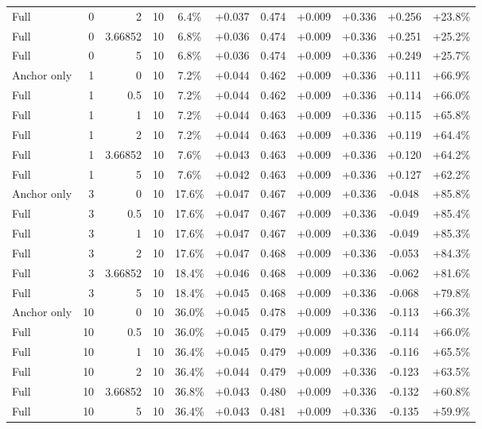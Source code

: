 \begin{table}[htbp]
\begin{tabular}{lrrrccccccc}
Full & 0 & 2 & 10 & 6.4\% & +0.037 & 0.474 & +0.009 & +0.336 & +0.256 & +23.8\% \\
Full & 0 & 3.66852 & 10 & 6.8\% & +0.036 & 0.474 & +0.009 & +0.336 & +0.251 & +25.2\% \\
Full & 0 & 5 & 10 & 6.8\% & +0.036 & 0.474 & +0.009 & +0.336 & +0.249 & +25.7\% \\
Anchor only & 1 & 0 & 10 & 7.2\% & +0.044 & 0.462 & +0.009 & +0.336 & +0.111 & +66.9\% \\
Full & 1 & 0.5 & 10 & 7.2\% & +0.044 & 0.462 & +0.009 & +0.336 & +0.114 & +66.0\% \\
Full & 1 & 1 & 10 & 7.2\% & +0.044 & 0.463 & +0.009 & +0.336 & +0.115 & +65.8\% \\
Full & 1 & 2 & 10 & 7.2\% & +0.044 & 0.463 & +0.009 & +0.336 & +0.119 & +64.4\% \\
Full & 1 & 3.66852 & 10 & 7.6\% & +0.043 & 0.463 & +0.009 & +0.336 & +0.120 & +64.2\% \\
Full & 1 & 5 & 10 & 7.6\% & +0.042 & 0.463 & +0.009 & +0.336 & +0.127 & +62.2\% \\
Anchor only & 3 & 0 & 10 & 17.6\% & +0.047 & 0.467 & +0.009 & +0.336 & -0.048 & +85.8\% \\
Full & 3 & 0.5 & 10 & 17.6\% & +0.047 & 0.467 & +0.009 & +0.336 & -0.049 & +85.4\% \\
Full & 3 & 1 & 10 & 17.6\% & +0.047 & 0.467 & +0.009 & +0.336 & -0.049 & +85.3\% \\
Full & 3 & 2 & 10 & 17.6\% & +0.047 & 0.468 & +0.009 & +0.336 & -0.053 & +84.3\% \\
Full & 3 & 3.66852 & 10 & 18.4\% & +0.046 & 0.468 & +0.009 & +0.336 & -0.062 & +81.6\% \\
Full & 3 & 5 & 10 & 18.4\% & +0.045 & 0.468 & +0.009 & +0.336 & -0.068 & +79.8\% \\
Anchor only & 10 & 0 & 10 & 36.0\% & +0.045 & 0.478 & +0.009 & +0.336 & -0.113 & +66.3\% \\
Full & 10 & 0.5 & 10 & 36.0\% & +0.045 & 0.479 & +0.009 & +0.336 & -0.114 & +66.0\% \\
Full & 10 & 1 & 10 & 36.4\% & +0.045 & 0.479 & +0.009 & +0.336 & -0.116 & +65.5\% \\
Full & 10 & 2 & 10 & 36.4\% & +0.044 & 0.479 & +0.009 & +0.336 & -0.123 & +63.5\% \\
Full & 10 & 3.66852 & 10 & 36.8\% & +0.043 & 0.480 & +0.009 & +0.336 & -0.132 & +60.8\% \\
Full & 10 & 5 & 10 & 36.4\% & +0.043 & 0.481 & +0.009 & +0.336 & -0.135 & +59.9\% \\

\end{tabular}
\end{table}

